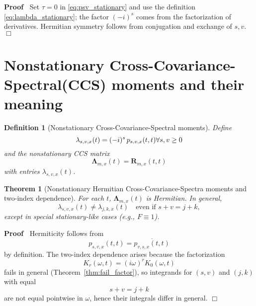 \documentclass{article}
\newcommand{\tmmathbf}[1]{\ensuremath{\boldsymbol{#1}}}
\newenvironment{proof}{\noindent\textbf{Proof\ }}{\hspace*{\fill}$\Box$\medskip}
\newtheorem{definition}{Definition}
\newtheorem{theorem}{Theorem}
\begin{document}
\begin{proof}
  Set $\tau = 0$ in \eqref{eq:psv_stationary} and use the definition
  \eqref{eq:lambda_stationary}; the factor $(- i)^s$ comes from the
  factorization of derivatives. Hermitian symmetry follows from conjugation
  and exchange of $s, v$.
\end{proof}

\section{Nonstationary Cross-Covariance-Spectral(CCS) moments and their
meaning}

\begin{definition}
  [Nonstationary Cross-Covariance-Spectral moments] Define
  \begin{equation}
    \label{eq:lambda_nonstat} \lambda_{s, v, x} (t) = (- i)^s  \hspace{0.17em}
    p_{s, v, x} (t, t) \forall s, v \ge 0
  \end{equation}
  and the nonstationary CCS matrix
  \begin{equation}
    \tmmathbf{\Lambda}_{m, x} (t) =\tmmathbf{R}_{m, x} (t, t)
  \end{equation}
  with entries $\lambda_{s, v, x} (t)$.
\end{definition}

\begin{theorem}
  [Nonstationary Hermitian Cross-Covariance-Spectra moments and two-index
  dependence]\label{thm:nonstat_hermitian} For each $t$,
  $\tmmathbf{\Lambda}_{m, x} (t)$ is Hermitian. In general,
  \begin{equation}
    \lambda_{s, v, x} (t) \neq \lambda_{j, k, x} (t)  \quad \text{even if } s
    + v = j + k,
  \end{equation}
  except in special stationary-like cases (e.g., $F \equiv 1$).
\end{theorem}

\begin{proof}
  Hermiticity follows from
  \begin{equation}
    p_{s, v, x} (t, t) = \overline{p_{v, s, x} (t, t)}
  \end{equation}
  by definition. The two-index dependence arises because the factorization
  \begin{equation}
    K_r (\omega, t) = (i \omega)^r K_0 (\omega, t)
  \end{equation}
  fails in general (Theorem~\ref{thm:fail_factor}), so integrands for $(s,
  v)$ and $(j, k)$ with equal
  \begin{equation}
    s + v = j + k
  \end{equation}
  are not equal pointwise in $\omega$, hence their integrals differ in
  general.
\end{proof}
\end{document}
